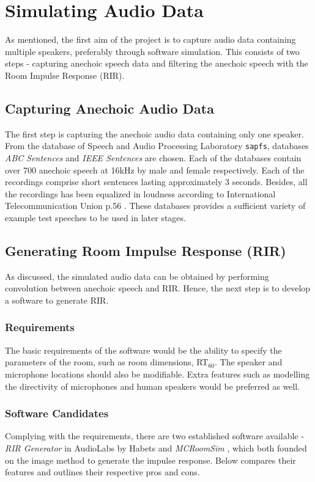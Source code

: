 \documentclass[a4paper,twoside,12pt,hidelinks]{article}
\begin{document}
\newpage
\section{Simulating Audio Data}
\label{sect:phaseI}
As mentioned, the first aim of the project is to capture audio data containing multiple speakers, preferably through software simulation. This consists of two steps - capturing anechoic speech data and filtering the anechoic speech with the Room Impulse Response (RIR).
\subsection{Capturing Anechoic Audio Data}
The first step is capturing the anechoic audio data containing only one speaker. From the database of Speech and Audio Processing Laboratory \texttt{sapfs}, databases \textit{ABC Sentences} and \textit{IEEE Sentences} are chosen. Each of the databases contain over 700 anechoic speech at 16kHz by male and female respectively. Each of the recordings comprise short sentences lasting approximately 3 seconds. Besides, all the recordings has been equalized in loudness according to International Telecommunication Union p.56 \cite{ITU-T2011ITU-TLevel}. These databases provides a sufficient variety of example test speeches to be used in later stages.

\subsection{Generating Room Impulse Response (RIR)}
As discussed, the simulated audio data can be obtained by performing convolution between anechoic speech and RIR. Hence, the next step is to develop a software to generate RIR. 
\subsubsection{Requirements}
The basic requirements of the software would be the ability to specify the parameters of the room, such as room dimensions, RT$_60$. The speaker and microphone locations should also be modifiable. Extra features such as modelling the directivity of microphones and human speakers would be preferred as well.

\subsubsection{Software Candidates}
Complying with the requirements, there are two established software available - \textit{RIR Generator} in AudioLabs by Habets \cite{Habets2017RoomMATLAB} and \textit{MCRoomSim} \cite{Schimmel2009ASimulator,Wabnitz2010RoomArrays}, which both founded on the image method to generate the impulse response. Below compares their features and outlines their respective pros and cons.
\end{document}
